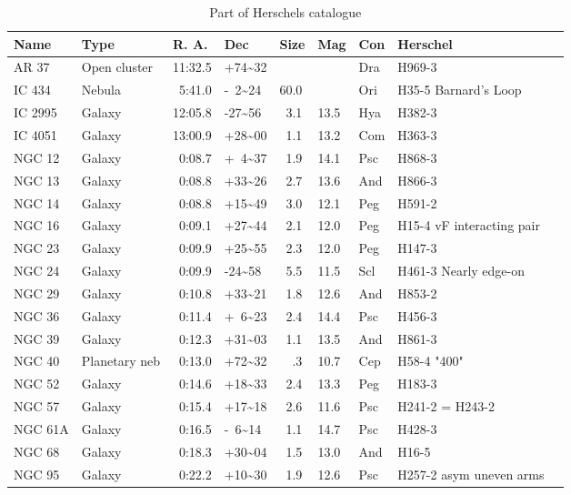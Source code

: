 \begin{table}[h]
\ttfamily
\tiny
\centering
\begin{tabular}{l l l l l l l l l}
Name & Type & R. A. & Dec & Size & Mag & Con & Herschel \\ \hline
AR 37 & Open cluster & 11:32.5 & +74\~{}32 & & & Dra & H969-3 \\
IC  434 & Nebula & ~5:41.0 & -~2\~{}24 & 60.0 & & Ori & H35-5  Barnard's Loop\\
IC 2995 & Galaxy & 12:05.8 & -27\~{}56 & ~3.1 & 13.5 & Hya & H382-3\\
IC 4051 & Galaxy & 13:00.9 & +28\~{}00 & ~1.1 & 13.2 & Com & H363-3\\
NGC 12 & Galaxy & ~0:08.7 & +~4\~{}37 & ~1.9 & 14.1 & Psc & H868-3\\
NGC 13 & Galaxy & ~0:08.8 & +33\~{}26 & ~2.7 & 13.6 & And & H866-3\\
NGC 14 & Galaxy & ~0:08.8 & +15\~{}49 & ~3.0 & 12.1 & Peg & H591-2\\
NGC 16 & Galaxy & ~0:09.1 & +27\~{}44 & ~2.1 & 12.0 & Peg & H15-4 vF interacting pair\\
NGC 23 & Galaxy & ~0:09.9 & +25\~{}55 & ~2.3 & 12.0 & Peg & H147-3\\
NGC 24 & Galaxy & ~0:09.9 & -24\~{}58 & ~5.5 & 11.5 & Scl & H461-3 Nearly edge-on\\
NGC 29 & Galaxy & ~0:10.8 & +33\~{}21 & ~1.8 & 12.6 & And & H853-2\\
NGC 36 & Galaxy & ~0:11.4 & +~6\~{}23 & ~2.4 & 14.4 & Psc & H456-3\\
NGC 39 & Galaxy & ~0:12.3 & +31\~{}03 & ~1.1 & 13.5 & And & H861-3\\
NGC 40 & Planetary neb & ~0:13.0 & +72\~{}32 & ~~.3 & 10.7 & Cep & H58-4 "400"\\
NGC 52 & Galaxy & ~0:14.6 & +18\~{}33 & ~2.4 & 13.3 & Peg & H183-3  \\
NGC 57 & Galaxy & ~0:15.4 & +17\~{}18 & ~2.6 & 11.6 & Psc & H241-2 = H243-2\\
NGC 61A & Galaxy & ~0:16.5 & -~6\~{}14 & ~1.1 & 14.7 & Psc & H428-3\\
NGC 68 & Galaxy & ~0:18.3 & +30\~{}04 & ~1.5 & 13.0 & And & H16-5\\
NGC 95 & Galaxy & ~0:22.2 & +10\~{}30 & ~1.9 & 12.6 & Psc & H257-2 asym uneven arms\\
\hline
\end{tabular}
\rmfamily
\caption{Part of Herschels catalogue}\label{tab:hers}
\end{table}


